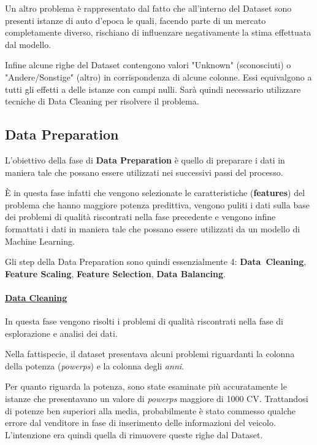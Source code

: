 Un altro problema è rappresentato dal fatto che all'interno del Dataset sono presenti istanze di auto d'epoca le quali, facendo parte di un mercato completamente diverso, rischiano di influenzare negativamente la stima effettuata dal modello. 

Infine alcune righe del Dataset contengono valori "Unknown" (sconosciuti) o "Andere/Sonstige" (altro) in corrispondenza di alcune colonne. Essi equivalgono a tutti gli effetti a delle istanze con campi nulli. Sarà quindi necessario utilizzare tecniche di Data Cleaning per risolvere il problema.
\medskip

\subsection{Data Preparation}
L'obiettivo della fase di \textbf{Data Preparation} è quello di preparare i dati in maniera tale che possano essere utilizzati nei successivi passi del processo.

È in questa fase infatti che vengono selezionate le caratteristiche (\textbf{features}) del problema che hanno maggiore potenza predittiva, vengono puliti i dati sulla base dei problemi di qualità riscontrati nella fase precedente e vengono infine formattati i dati in maniera tale che possano essere utilizzati da un modello di Machine Learning.

\noindent Gli step della Data Preparation sono quindi essenzialmente 4: \mbox{\textbf{Data Cleaning}}, \textbf{Feature Scaling}, \textbf{Feature Selection}, \textbf{Data Balancing}.
\bigskip
\bigskip

\paragraph{\textcolor[HTML]{000099}{\underline{Data Cleaning}}}
In questa fase vengono risolti i problemi di qualità riscontrati nella fase di esplorazione e analisi dei dati.

Nella fattispecie, il dataset presentava alcuni problemi riguardanti la colonna della potenza (\textit{power\textunderscore ps}) e la colonna degli \textit{anni}.

Per quanto riguarda la potenza, sono state esaminate più accuratamente le istanze che presentavano un valore di \textit{power\textunderscore ps} maggiore di 1000 CV. Trattandosi di potenze ben superiori alla media, probabilmente è stato commesso qualche errore dal venditore in fase di inserimento delle informazioni del veicolo. L'intenzione era quindi quella di rimuovere queste righe dal Dataset.

